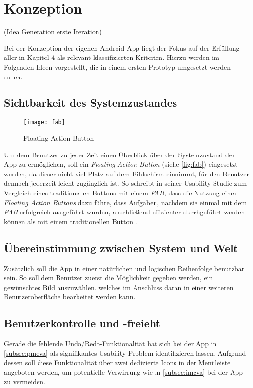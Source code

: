 \chapter{Konzeption}\label{chap:concept}
(Idea Generation erste Iteration)

Bei der Konzeption der eigenen Android-App liegt der Fokus auf der Erfüllung aller in Kapitel 4 als relevant klassifizierten Kriterien.
Hierzu werden im Folgenden Ideen vorgestellt, die in einem ersten Prototyp umgesetzt werden sollen.

\section{Sichtbarkeit des Systemzustandes}

\begin{wrapfigure}{R}{0.5\textwidth}
  \centering
  \texttt{[image: fab]}
  \caption{Floating Action Button}
  \label{fig:fab}
\end{wrapfigure}

Um dem Benutzer zu jeder Zeit einen Überblick über den Systemzustand der App zu ermöglichen, soll ein \emph{Floating Action Button} (siehe \autoref{fig:fab}) eingesetzt werden, da dieser nicht viel Platz auf dem Bildschirm einnimmt, für den Benutzer dennoch jederzeit leicht zugänglich ist.
So schreibt \citeauthor{SJ16} in seiner Usability-Studie zum Vergleich eines traditionellen Buttons mit einem \emph{FAB}, dass die Nutzung eines \emph{Floating Action Buttons} dazu führe, dass Aufgaben, nachdem sie einmal mit dem \emph{FAB} erfolgreich ausgeführt wurden, anschließend effizienter durchgeführt werden können als mit einem traditionellen Button \citep[Seiten 14--16]{SJ16}.

\section{Übereinstimmung zwischen System und Welt}
Zusätzlich soll die App in einer natürlichen und logischen Reihenfolge benutzbar sein.
So soll dem Benutzer zuerst die Möglichkeit gegeben werden, ein gewünschtes Bild auszuwählen, welches im Anschluss daran in einer weiteren Benutzeroberfläche bearbeitet werden kann.

\section{Benutzerkontrolle und -freieht}
Gerade die fehlende Undo/Redo-Funktionalität hat sich bei der App \pm{} in \autoref{subsec:pmeva} als  signifikantes Usability-Problem identifizieren lassen.
Aufgrund dessen soll diese Funktionalität über zwei dedizierte Icons in der Menüleiste angeboten werden, um potentielle Verwirrung wie in \autoref{subsec:imeva} bei der App \im{} zu vermeiden.

